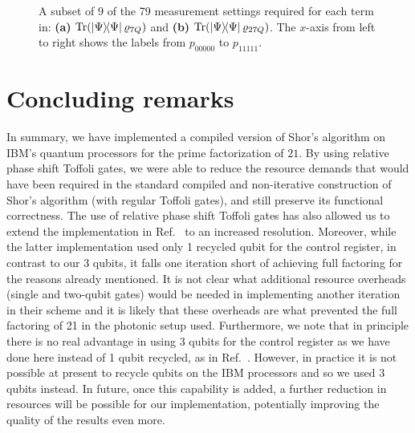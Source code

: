 
\begin{figure*}[h!]
\end{figure*}

\clearpage

\begin{figure*}[t!]
	\addtocounter{subfigure}{1}
    \caption[A subset of 9 of the 79 measurement settings.]{A subset of 9 of the 79 measurement settings required for each term in: \textbf{(a)} $\Tr(\op{\Psi}{\Psi}\varrho_{7Q})$ and \textbf{(b)} $\Tr(\op{\Psi}{\Psi}\varrho_{27Q})$. The $x$-axis from left to right shows the labels from $p_{00000}$ to $p_{11111}$.}
\end{figure*}

\clearpage

\section{Concluding remarks}
In summary, we have implemented a compiled version of Shor's algorithm on IBM's quantum processors for the prime factorization of $21$. By using relative phase shift Toffoli gates, we were able to reduce the resource demands that would have been required in the standard compiled and non-iterative construction of Shor's algorithm (with regular Toffoli gates), and still preserve its functional correctness. The use of relative phase shift Toffoli gates has also allowed us to extend the implementation in Ref.~\cite{Lopez_2012} to an increased resolution. Moreover, while the latter implementation used only 1 recycled qubit for the control register, in contrast to our 3 qubits, it falls one iteration short of achieving full factoring for the reasons already mentioned. It is not clear what additional resource overheads (single and two-qubit gates) would be needed in implementing another iteration in their scheme and it is likely that these overheads are what prevented the full factoring of 21 in the photonic setup used. Furthermore, we note that in principle there is no real advantage in using 3 qubits for the control register as we have done here instead of 1 qubit recycled, as in Ref.~\cite{Lopez_2012}. However, in practice it is not possible at present to recycle qubits on the IBM processors and so we used 3 qubits instead. In future, once this capability is added, a further reduction in resources will be possible for our implementation, potentially improving the quality of the results even more. 

